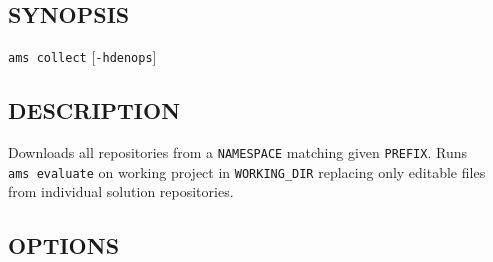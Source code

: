 \subsection{SYNOPSIS}\label{synopsis-1}

\texttt{ams\ collect} {[}\texttt{-hdenops}{]}

\subsection{DESCRIPTION}\label{description-1}

Downloads all repositories from a \texttt{NAMESPACE} matching given \texttt{PREFIX}. Runs \texttt{ams\ evaluate} on working project in \texttt{WORKING\_DIR} replacing only editable files from individual solution repositories.

\subsection{OPTIONS}\label{options-1}

